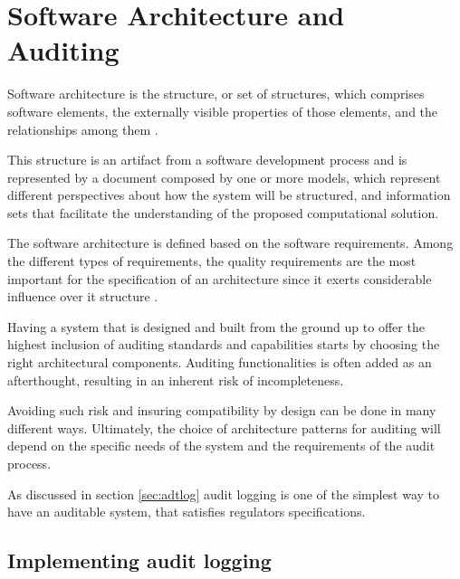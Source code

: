 %
\chapter{Software Architecture and Auditing}\label{chap:sadt}

Software architecture is the structure, or set of structures, which comprises software elements, the externally visible properties of those elements, and the relationships among them \citep{SAIP}. 

This structure is an artifact from a software development process and is represented by a document composed by one or more models, which represent different perspectives about how the system will be structured, and information sets that facilitate the understanding of the proposed computational solution. 

The software architecture is defined based on the software requirements. Among the different types of requirements, the quality requirements are the most important for the specification of an architecture since it exerts considerable influence over it structure \citep{SAIP}.

Having a system that is designed and built from the ground up to offer the highest inclusion of auditing standards and capabilities starts by choosing the right architectural components. Auditing functionalities is often added as an afterthought, resulting in an inherent risk of incompleteness. 

Avoiding such risk and insuring compatibility by design can be done in many different ways. Ultimately, the choice of architecture patterns for auditing will depend on the specific needs of the system and the requirements of the audit process.

As discussed in section \ref{sec:adtlog} audit logging is one of the simplest way to have an auditable system, that satisfies regulators specifications.



\section{Implementing audit logging}\label{sec:adtimpl}

